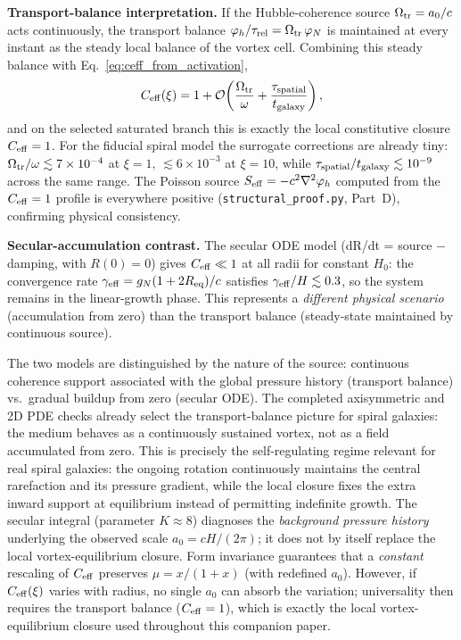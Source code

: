 \documentclass[11pt]{article}
\begin{document}
\textbf{Transport-balance interpretation.}
If the Hubble-coherence source $\Omega_{\rm tr}=a_0/c$ acts
continuously, the transport balance
$\varphi_h/\tau_{\rm rel}=\Omega_{\rm tr}\,\varphi_N$ is
maintained at every instant as the steady local balance of
the vortex cell.
Combining this steady balance with Eq.~\eqref{eq:ceff_from_activation},
\begin{equation}
C_{\rm eff}(\xi) = 1 + \mathcal{O}\!\left(
\frac{\Omega_{\rm tr}}{\omega}
+ \frac{\tau_{\rm spatial}}{t_{\rm galaxy}}
\right),
\label{eq:ceff_unity}
\end{equation}
and on the selected saturated branch this is exactly the local constitutive
closure $C_{\rm eff}=1$.  For the fiducial spiral model the surrogate
corrections are already tiny:
$\Omega_{\rm tr}/\omega\lesssim7\times10^{-4}$ at $\xi=1$,
$\lesssim6\times10^{-3}$ at $\xi=10$, while
$\tau_{\rm spatial}/t_{\rm galaxy}\lesssim10^{-9}$ across the same range.
The Poisson source
$S_{\rm eff}=-c^2\nabla^2\varphi_h$ computed from the $C_{\rm eff}=1$
profile is everywhere positive (\texttt{structural\_proof.py}, Part~D),
confirming physical consistency.

\textbf{Secular-accumulation contrast.}
The secular ODE model (dR/dt = source $-$ damping, with $R(0)=0$)
gives $C_{\rm eff}\ll 1$ at all radii for constant $H_0$:
the convergence rate $\gamma_{\rm eff}=g_N(1+2R_{\rm eq})/c$
satisfies $\gamma_{\rm eff}/H\lesssim 0.3$, so the system remains
in the linear-growth phase.
This represents a \emph{different physical scenario}
(accumulation from zero) than the transport balance
(steady-state maintained by continuous source).

The two models are distinguished by the nature of the
source: continuous coherence support associated with the
global pressure history (transport balance)
vs.\ gradual buildup from zero (secular ODE).
The completed axisymmetric and 2D PDE checks already select
the transport-balance picture for spiral galaxies: the
medium behaves as a continuously sustained vortex, not as a
field accumulated from zero.
This is precisely the self-regulating regime relevant for real spiral
galaxies: the ongoing rotation continuously maintains the central
rarefaction and its pressure gradient, while the local closure fixes the
extra inward support at equilibrium instead of permitting indefinite
growth.
The secular integral (parameter $K\approx 8$) diagnoses
the \emph{background pressure history} underlying the observed
scale $a_0=cH/(2\pi)$; it does not by itself replace the local
vortex-equilibrium closure.
Form invariance guarantees that a \emph{constant} rescaling
of $C_{\rm eff}$ preserves $\mu=x/(1+x)$ (with redefined
$a_0$).  However, if $C_{\rm eff}(\xi)$ varies with radius,
no single $a_0$ can absorb the variation; universality
then requires the transport balance ($C_{\rm eff}=1$),
which is exactly the local vortex-equilibrium closure used
throughout this companion paper.
\end{document}
